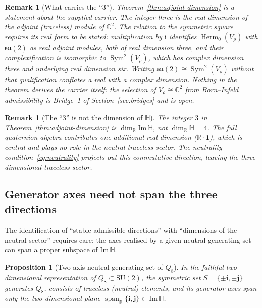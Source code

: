 \documentclass[11pt,a4paper]{article}
\newtheorem{proposition}[theorem]{Proposition}
\newtheorem{remark}[theorem]{Remark}
\newcommand{\ImH}{\mathrm{Im}\,\mathbb{H}}
\newcommand{\su}{\mathfrak{su}}
\newcommand{\SU}{\mathrm{SU}}
\begin{document}
    \begin{remark}[What carries the ``3'']
      \label{rem:what-carries-three}
      Theorem~\ref{thm:adjoint-dimension} is a statement about the supplied carrier.
      The integer three is the real dimension of the adjoint (traceless) module of
      $\mathbb{C}^{2}$.
      The relation to the symmetric square requires its real form to be stated: multiplication
      by $\mathrm{i}$ identifies $\operatorname{Herm}_{0}(V_{\rho})$ with $\su(2)$ as real
      adjoint modules, both of real dimension three, and their complexification is isomorphic
      to $\operatorname{Sym}^{2}(V_{\rho})$, which has complex dimension three and underlying
      real dimension six.
      Writing $\su(2) \cong \operatorname{Sym}^{2}(V_{\rho})$ without that qualification
      conflates a real with a complex dimension.
      Nothing in the theorem derives the carrier itself: the selection of
      $V_{\rho} \cong \mathbb{C}^{2}$ from Born--Infeld admissibility is
      Bridge~1 of Section~\ref{sec:bridges} and is open.
    \end{remark}

    \begin{remark}[The ``$3$'' is not the dimension of $\mathbb{H}$]
      \label{rem:not-four}
      The integer $3$ in Theorem~\ref{thm:adjoint-dimension} is $\dim_{\mathbb{R}}
      \ImH$, not $\dim_{\mathbb{R}} \mathbb{H} = 4$.
      The full quaternion algebra contributes one additional real dimension ($\mathbb{R}
      \cdot \mathbf{1}$), which is central and plays no role in the neutral traceless
      sector.
      The neutrality condition~\eqref{eq:neutrality} projects out this
      commutative direction, leaving the three-dimensional traceless sector.
    \end{remark}

  \subsection{Generator axes need not span the three directions}
    \label{ssec:generator-axes}

    The identification of ``stable admissible directions'' with ``dimensions of the
    neutral sector'' requires care: the axes realised by a given neutral generating set
    can span a proper subspace of $\ImH$.

    \begin{proposition}[Two-axis neutral generating set of $Q_{8}$]
      \label{prop:q8-two-axes}
      In the faithful two-dimensional representation of $Q_{8} \subset \SU(2)$, the
      symmetric set $S = \{\pm\mathbf{i}, \pm\mathbf{j}\}$ generates $Q_{8}$, consists of
      traceless (neutral) elements, and its generator axes span only the two-dimensional
      plane $\operatorname{span}_{\mathbb{R}}\{\mathbf{i}, \mathbf{j}\} \subset \ImH$.
    \end{proposition}
\end{document}
